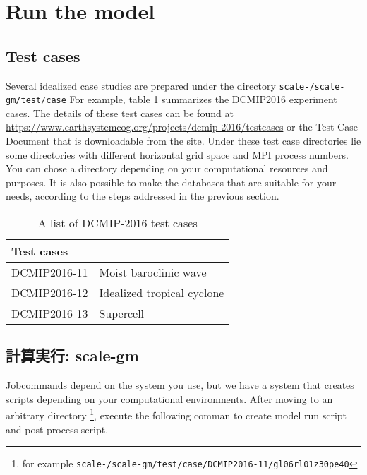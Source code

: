 
\section{Run the model}
\subsection{Test cases}

Several idealized case studies are prepared under the directory 
\noindent \texttt{scale-{\version}/scale-gm/test/case} 
For example, table 1 summarizes the DCMIP2016 experiment cases.
The details of these test cases can be found at 
\url{https://www.earthsystemcog.org/projects/dcmip-2016/testcases}
or the Test Case Document that is downloadable from the site.
Under these test case directories lie some directories with 
different horizontal grid space and MPI process numbers. 
You can chose a directory depending on your computational resources 
and purposes.
It is also possible to make the databases that are suitable for your needs,
according to the steps addressed in the previous section.
 \begin{table}[h]
 \begin{center}
 \caption{A list of DCMIP-2016 test cases}
 \begin{tabularx}{150mm}{|l|X|} \hline
 \rowcolor[gray]{0.9} Test cases \\ \hline
  DCMIP2016-11 & Moist baroclinic wave  \\ \hline
  DCMIP2016-12 & Idealized tropical cyclone \\ \hline
  DCMIP2016-13 & Supercell \\ \hline
 \end{tabularx}
 \end{center}
 \end{table}


\subsection{計算実行: scale-gm}

Jobcommands depend on the system you use, but we have a system 
that creates scripts depending on your computational environments.
After moving to an arbitrary directory \footnote{for example
  \texttt{scale-{\version}/scale-gm/test/case/DCMIP2016-11/gl06rl01z30pe40}},
execute the following comman to create model run script and post-process script.

